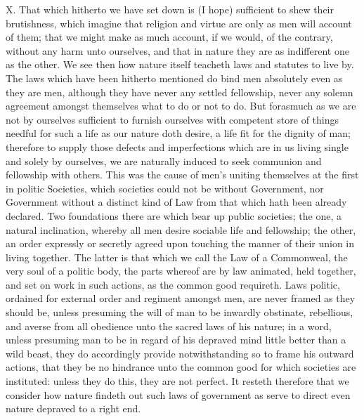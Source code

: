 X. That which hitherto we have set down is (I hope) sufficient to shew their brutishness, which imagine that religion and virtue are only as men will account of them; that we might make as much account, if we would, of the contrary, without any harm unto ourselves, and that in nature they are as indifferent one as the other. We see then how nature itself teacheth laws and statutes to live by. The laws which have been hitherto mentioned do bind men absolutely even as they are men, although they have never any settled fellowship, never any solemn agreement amongst themselves what to do or not to do. But forasmuch as we are not by ourselves sufficient to furnish ourselves with competent store of things needful for such a life as our nature doth desire, a life fit for the dignity of man; therefore to supply those defects and imperfections which are in us living single and solely by ourselves, we are naturally induced to seek communion and fellowship with others. This was the cause of men’s uniting themselves at the first in politic Societies, which societies could not be without Government, nor Government without a distinct kind of Law from that which hath been already declared. Two foundations there are which bear up public societies; the one, a natural inclination, whereby all men desire sociable life and fellowship; the other, an order expressly or secretly agreed upon touching the manner of their union in living together. The latter is that which we call the Law of a Commonweal, the very soul of a politic body, the parts whereof are by law animated, held together, and set on work in such actions, as the common good requireth. Laws politic, ordained for external order and regiment amongst men, are never framed as they  should be, unless presuming the will of man to be inwardly obstinate, rebellious, and averse from all obedience unto the sacred laws of his nature; in a word, unless presuming man to be in regard of his depraved mind little better than a wild beast, they do accordingly provide notwithstanding so to frame his outward actions, that they be no hindrance unto the common good for which societies are instituted: unless they do this, they are not perfect. It resteth therefore that we consider how nature findeth out such laws of government as serve to direct even nature depraved to a right end.

